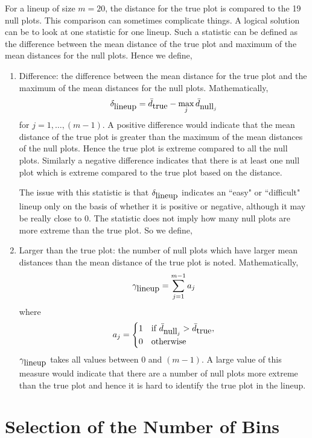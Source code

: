 \documentclass[12]{article}
\begin{document}
For a lineup of size $m = 20$, the distance for the true plot is compared to the 19 null plots. This comparison can sometimes complicate things. A logical solution can be to look at one statistic for one lineup. Such a statistic can be defined as the difference between the mean distance of the true plot and maximum of the mean distances for the null plots. Hence we define, 
\begin{enumerate}
\item Difference: the difference between the mean distance for the true plot and the maximum of the mean distances for the null plots. Mathematically,
$$\delta_{\hbox{lineup}} = \bar{d}_{\hbox{true}} - \max_j \bar{d}_{\hbox{null}_j}$$
for $j = 1, \dots, (m  - 1).$
 A positive difference would indicate that the mean distance of the true plot is greater than the maximum of the mean distances of the null plots. Hence the true plot is extreme compared to all the null plots. Similarly a negative difference indicates that there is at least one null plot which is extreme compared to the true plot based on the distance.
 
The issue with this statistic is that $\delta_{\hbox{lineup}}$ indicates an ``easy" or ``difficult" lineup only on the basis of whether it is positive or negative, although it may be really close to 0. The statistic does not imply how many null plots are more extreme than the true plot. So we define,
\item Larger than the true plot: the number of null plots which have larger mean distances than the mean distance of the true plot is noted. Mathematically,
 $$\gamma_{\hbox{lineup}} = \sum_{j = 1}^{m - 1} a_j$$ where 
\begin{equation}
a_j =
\begin{cases}
1 & \text{if } \bar{d}_{\hbox{null}_j} > \bar{d}_{\hbox{true}} ,
\\
0 & \text{otherwise}
\end{cases}
\end{equation}
$\gamma_{\hbox{lineup}}$ takes all values between 0 and $(m - 1)$. A large value of this measure would indicate that there are a number of null plots more extreme than the true plot and hence it is hard to identify the true plot in the lineup.
\end{enumerate}



\section{Selection of the Number of Bins} \label{sec:nbin}
\end{document}
